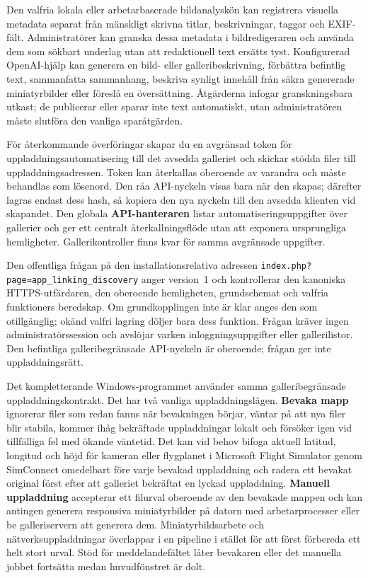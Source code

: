 \documentclass[11pt,a4paper]{article}
\newcommand{\ui}[1]{\textbf{#1}}
\begin{document}
Den valfria lokala eller arbetarbaserade bildanalyskön kan registrera visuella
metadata separat från mänskligt skrivna titlar, beskrivningar, taggar och
EXIF-fält. Administratörer kan granska dessa metadata i bildredigeraren och
använda dem som sökbart underlag utan att redaktionell text ersätts tyst.
Konfigurerad OpenAI-hjälp kan generera en bild- eller galleribeskrivning,
förbättra befintlig text, sammanfatta sammanhang, beskriva synligt innehåll från
säkra genererade miniatyrbilder eller föreslå en översättning. Åtgärderna
infogar granskningsbara utkast; de publicerar eller sparar inte text
automatiskt, utan administratören måste slutföra den vanliga sparåtgärden.

För återkommande överföringar skapar du en avgränsad token för
uppladdningsautomatisering till det avsedda galleriet och skickar stödda filer
till uppladdningsadressen. Token kan återkallas oberoende av varandra och måste
behandlas som lösenord. Den råa API-nyckeln visas bara när den skapas; därefter
lagras endast dess hash, så kopiera den nya nyckeln till den avsedda klienten
vid skapandet. Den globala \ui{API-hanteraren} listar automatiseringsuppgifter
över gallerier och ger ett centralt återkallningsflöde utan att exponera
ursprungliga hemligheter. Gallerikontroller finns kvar för samma avgränsade
uppgifter.

Den offentliga frågan på den installationsrelativa adressen
\texttt{index.php?page=app\_linking\_discovery} anger version~1 och kontrollerar
den kanoniska HTTPS-utfärdaren, den oberoende hemligheten, grundschemat och
valfria funktioners beredskap. Om grundkopplingen inte är klar anges den som
otillgänglig; okänd valfri lagring döljer bara dess funktion. Frågan kräver ingen
administratörssession och avslöjar varken inloggningsuppgifter eller
gallerilistor. Den befintliga galleribegränsade API-nyckeln är oberoende;
frågan ger inte uppladdningsrätt.

Det kompletterande Windows-programmet använder samma galleribegränsade
uppladdningskontrakt. Det har två vanliga uppladdningslägen. \ui{Bevaka mapp}
ignorerar filer som redan fanns när bevakningen börjar, väntar på att nya filer
blir stabila, kommer ihåg bekräftade uppladdningar lokalt och försöker igen vid
tillfälliga fel med ökande väntetid. Det kan vid behov bifoga aktuell latitud,
longitud och höjd för kameran eller flygplanet i Microsoft Flight Simulator
genom SimConnect omedelbart före varje bevakad uppladdning och radera ett
bevakat original först efter att galleriet bekräftat en lyckad uppladdning.
\ui{Manuell uppladdning} accepterar ett filurval oberoende av den bevakade
mappen och kan antingen generera responsiva miniatyrbilder på datorn med
arbetarprocesser eller be galleriservern att generera dem. Miniatyrbildsarbete
och nätverksuppladdningar överlappar i en pipeline i stället för att först
förbereda ett helt stort urval. Stöd för meddelandefältet låter bevakaren eller
det manuella jobbet fortsätta medan huvudfönstret är dolt.
\end{document}

